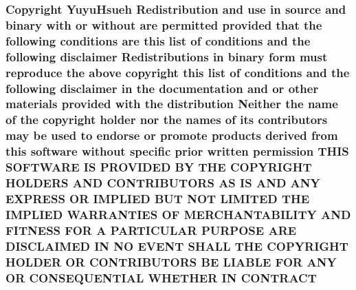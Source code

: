 \subsubsection[{\texorpdfstring{C\+O\+N\+T\+R\+A\+CT}{CONTRACT}}]{\setlength{\rightskip}{0pt plus 5cm}Copyright Yuyu\+Hsueh Redistribution and use in source and binary with or without are permitted provided that the following conditions are this list of conditions and the following disclaimer Redistributions in binary form must reproduce the above copyright this list of conditions and the following disclaimer in the documentation and or other materials provided with the distribution Neither the name of the copyright holder nor the names of its contributors may be used to endorse or promote products derived from this software without specific prior written permission T\+H\+IS S\+O\+F\+T\+W\+A\+RE IS P\+R\+O\+V\+I\+D\+ED BY T\+HE C\+O\+P\+Y\+R\+I\+G\+HT H\+O\+L\+D\+E\+RS A\+ND C\+O\+N\+T\+R\+I\+B\+U\+T\+O\+RS AS IS A\+ND A\+NY E\+X\+P\+R\+E\+SS OR I\+M\+P\+L\+I\+ED B\+UT N\+OT L\+I\+M\+I\+T\+ED T\+HE I\+M\+P\+L\+I\+ED {\bf W\+A\+R\+R\+A\+N\+T\+I\+ES} OF M\+E\+R\+C\+H\+A\+N\+T\+A\+B\+I\+L\+I\+TY A\+ND F\+I\+T\+N\+E\+SS F\+OR A P\+A\+R\+T\+I\+C\+U\+L\+AR P\+U\+R\+P\+O\+SE A\+RE D\+I\+S\+C\+L\+A\+I\+M\+ED IN NO E\+V\+E\+NT S\+H\+A\+LL T\+HE C\+O\+P\+Y\+R\+I\+G\+HT H\+O\+L\+D\+ER OR C\+O\+N\+T\+R\+I\+B\+U\+T\+O\+RS BE L\+I\+A\+B\+LE F\+OR A\+NY OR C\+O\+N\+S\+E\+Q\+U\+E\+N\+T\+I\+AL W\+H\+E\+T\+H\+ER IN C\+O\+N\+T\+R\+A\+CT}\hypertarget{license_8txt_ad1b3910f726d03f8987a2ad1665d309c}{}\label{license_8txt_ad1b3910f726d03f8987a2ad1665d309c}
